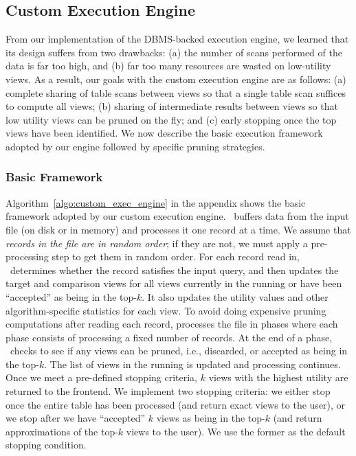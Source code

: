 

\subsection{Custom Execution Engine}
\label{sec:in_memory_execution_engine}

From our implementation of the DBMS-backed execution engine, 
we learned that its design suffers from two drawbacks:
(a) the number of scans performed of the data is far too high, and
(b) far too many resources are wasted on low-utility views.
As a result, our goals with the custom execution engine are as follows:
(a) complete sharing of table scans between views so that a single table scan
suffices to compute all views; 
(b) sharing of intermediate results between views so that low utility views can
be pruned on the fly; and 
(c) early stopping once the top views have been identified. 
We now describe the
basic execution framework adopted by our engine followed by specific
pruning strategies.

\subsubsection{Basic Framework}
\label{subsec:basic_framework}
Algorithm~\ref{algo:custom_exec_engine} in the appendix shows the basic framework adopted by our
custom execution engine.
\SeeDB\ buffers data from the input file (on disk or in memory) and processes it
one record at a time.
We assume that {\it records in the file are in random order}; if they are not,
we must apply a pre-processing step to get them in random order.
For each record read in, \SeeDB\ determines whether the record satisfies the
input query, and then updates the target and comparison views for all views
currently in the running or have been ``accepted'' as being in the top-$k$.
It also updates the utility values and other algorithm-specific statistics for
each view.
To avoid doing expensive pruning computations after reading each record,
\SeeDB processes the file in phases where each phase consists of processing a
fixed number of records.
At the end of a phase, \SeeDB\ checks to see if any views can be pruned,
i.e., discarded, or accepted as being in the top-$k$.
The list of views in the running is updated and processing continues.
Once we meet a pre-defined stopping criteria, $k$ views with the
highest utility are returned to the frontend.
We implement two stopping criteria: we either stop once the entire table has
been processed (and return exact views to the user), or we stop after
we have ``accepted'' $k$ views as being in the top-$k$ (and return
approximations of the top-$k$ views to the user).
We use the former as the default stopping condition.

